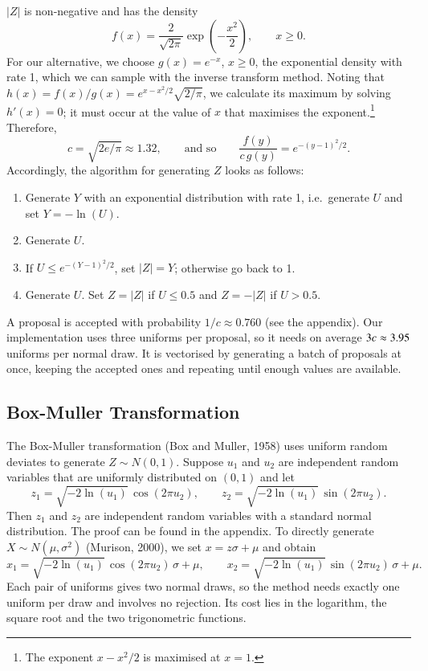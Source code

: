 \documentclass[12pt,a4paper]{article}
\begin{document}
$|Z|$ is non-negative and has the density
\[
f(x) = \frac{2}{\sqrt{2\pi}}\exp\left(-\frac{x^2}{2}\right), \qquad x \ge 0.
\]
For our alternative, we choose $g(x) = e^{-x}$, $x \ge 0$, the exponential density with rate 1, which we can sample with the inverse transform method. Noting that $h(x) = f(x)/g(x) = e^{x - x^2/2}\sqrt{2/\pi}$, we calculate its maximum by solving $h'(x) = 0$; it must occur at the value of $x$ that maximises the exponent.\footnote{The exponent $x - x^2/2$ is maximised at $x = 1$.} Therefore,
\[
c = \sqrt{2e/\pi} \approx 1.32, \qquad \text{and so} \qquad \frac{f(y)}{c\,g(y)} = e^{-(y-1)^2/2}.
\]
Accordingly, the algorithm for generating $Z$ looks as follows:
\begin{enumerate}
\item Generate $Y$ with an exponential distribution with rate 1, i.e.\ generate $U$ and set $Y = -\ln(U)$.
\item Generate $U$.
\item If $U \le e^{-(Y-1)^2/2}$, set $|Z| = Y$; otherwise go back to 1.
\item Generate $U$. Set $Z = |Z|$ if $U \le 0.5$ and $Z = -|Z|$ if $U > 0.5$.
\end{enumerate}
A proposal is accepted with probability $1/c \approx 0.760$ (see the appendix). Our implementation uses three uniforms per proposal, so it needs on average $3c \approx 3.95$ uniforms per normal draw. It is vectorised by generating a batch of proposals at once, keeping the accepted ones and repeating until enough values are available.

\subsection{Box-Muller Transformation}

The Box-Muller transformation (Box and Muller, 1958) uses uniform random deviates to generate $Z \sim N(0,1)$. Suppose $u_1$ and $u_2$ are independent random variables that are uniformly distributed on $(0,1)$ and let
\[
z_1 = \sqrt{-2\ln(u_1)}\,\cos(2\pi u_2), \qquad z_2 = \sqrt{-2\ln(u_1)}\,\sin(2\pi u_2).
\]
Then $z_1$ and $z_2$ are independent random variables with a standard normal distribution. The proof can be found in the appendix. To directly generate $X \sim N(\mu,\sigma^2)$ (Murison, 2000), we set $x = z\sigma + \mu$ and obtain
\[
x_1 = \sqrt{-2\ln(u_1)}\,\cos(2\pi u_2)\,\sigma + \mu, \qquad x_2 = \sqrt{-2\ln(u_1)}\,\sin(2\pi u_2)\,\sigma + \mu.
\]
Each pair of uniforms gives two normal draws, so the method needs exactly one uniform per draw and involves no rejection. Its cost lies in the logarithm, the square root and the two trigonometric functions.
\end{document}
